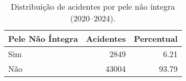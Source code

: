 \begin{table}
\caption{Distribuição de acidentes por pele não íntegra (2020–2024).}
\begin{tabular}{lrr}
\toprule
Pele Não Íntegra & Acidentes & Percentual \\
\midrule
Sim & 2849 & 6.21 \\
Não & 43004 & 93.79 \\
\bottomrule
\end{tabular}
\end{table}

